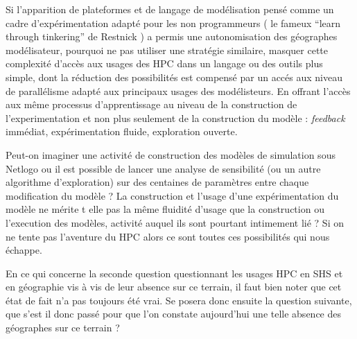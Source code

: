 Si l'apparition de plateformes et de langage de modélisation pensé comme un cadre d'expérimentation adapté pour les non programmeurs ( le fameux \foreignquote{english}{learn through tinkering} de Restnick ) a permis une autonomisation des géographes modélisateur, pourquoi ne pas utiliser une stratégie similaire, masquer cette complexité d'accès aux usages des HPC dans un langage ou des outils plus simple, dont la réduction des possibilités est compensé par un accés aux niveau de parallélisme adapté aux principaux usages des modélisteurs. En offrant l'accès aux même processus d'apprentissage au niveau de la construction de l'experimentation et non plus seulement de la construction du modèle : \textit{feedback} immédiat, expérimentation fluide, exploration ouverte.

Peut-on imaginer une activité de construction des modèles de simulation sous Netlogo ou il est possible de lancer une analyse de sensibilité (ou un autre algorithme d'exploration) sur des centaines de paramètres entre chaque modification du modèle ? La construction et l'usage d'une expérimentation du modèle ne mérite t elle pas la même fluidité d'usage que la construction ou l'execution des modèles, activité auquel ils sont pourtant intimement lié ? Si on ne tente pas l'aventure du HPC alors ce sont toutes ces possibilités qui nous échappe.








En ce qui concerne la seconde question questionnant les usages HPC en SHS et en géographie vis à vis de leur absence sur ce terrain, il faut bien noter que cet état de fait n'a pas toujours été vrai. Se posera donc ensuite la question suivante, que s'est il donc passé pour que l'on constate aujourd'hui une telle absence des géographes sur ce terrain ?

